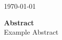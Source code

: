 \documentclass[12pt]{scrreprt}
\begin{document}
\begin{titlepage}


{\large \today}\\ [1.5cm]


 
% 
\vspace{3cm} %

\textbf{Abstract} \\ 
Example Abstract


\vfill %

\end{titlepage}
\end{document}

